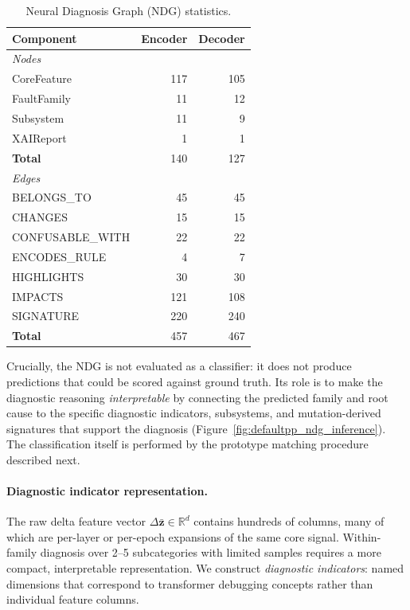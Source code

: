 \begin{table}[!ht]
\centering
\caption{Neural Diagnosis Graph (NDG) statistics.}
\label{tab:ndg}
\small
\begin{tabular}{l rr}
\toprule
Component & Encoder & Decoder \\
\midrule
\multicolumn{3}{l}{\textit{Nodes}} \\
\quad CoreFeature & 117 & 105 \\
\quad FaultFamily & 11 & 12 \\
\quad Subsystem & 11 & 9 \\
\quad XAIReport & 1 & 1 \\
\quad \textbf{Total} & 140 & 127 \\
\midrule
\multicolumn{3}{l}{\textit{Edges}} \\
\quad BELONGS\_TO & 45 & 45 \\
\quad CHANGES & 15 & 15 \\
\quad CONFUSABLE\_WITH & 22 & 22 \\
\quad ENCODES\_RULE & 4 & 7 \\
\quad HIGHLIGHTS & 30 & 30 \\
\quad IMPACTS & 121 & 108 \\
\quad SIGNATURE & 220 & 240 \\
\quad \textbf{Total} & 457 & 467 \\
\bottomrule
\end{tabular}
\end{table}

Crucially, the NDG is not evaluated as a classifier: it does not produce predictions that could be scored against ground truth. Its role is to make the diagnostic reasoning \emph{interpretable} by connecting the predicted family and root cause to the specific diagnostic indicators, subsystems, and mutation-derived signatures that support the diagnosis (Figure~\ref{fig:defaultpp_ndg_inference}). The classification itself is performed by the prototype matching procedure described next.

\paragraph{Diagnostic indicator representation.}
\label{sec:defaultpp_indicators}

The raw delta feature vector $\Delta\bar{\mathbf{z}} \in \mathbb{R}^d$ contains hundreds of columns, many of which are per-layer or per-epoch expansions of the same core signal. Within-family diagnosis over 2--5 subcategories with limited samples requires a more compact, interpretable representation. We construct \emph{diagnostic indicators}: named dimensions that correspond to transformer debugging concepts rather than individual feature columns.

